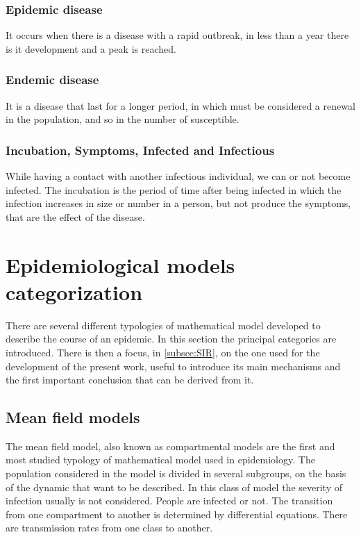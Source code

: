 \subsubsection{Epidemic disease} It occurs when there is a disease with a rapid outbreak, in less than a year there is it development and a peak is reached. 

\subsubsection{Endemic disease} It is a disease that last for a longer period, in which must be considered a renewal in the population, and so in the number of susceptible.

\subsubsection{Incubation, Symptoms, Infected and Infectious}   While having a contact with another infectious individual, we can or not become infected. The incubation is the period of time after being infected in which the infection increases in size or number in a person, but not produce the symptoms, that are the effect of the disease. 
\section{Epidemiological models categorization }
There are several different typologies of mathematical model developed to describe the course of an epidemic. In this section the principal categories are introduced. There is then a focus, in \ref{subsec:SIR}, on the one used for the development of the present work, useful to introduce its main mechanisms and the first important conclusion that can be derived from it. 


 
\subsection{Mean field models}

The mean field model, also known as compartmental models are the first and most studied typology of mathematical model used in epidemiology.  The population considered in the model is divided in several subgroups, on the basis of the dynamic that want to be described. In this class of model  the severity of infection usually is not considered. People are infected or not. The transition from one compartment to another is determined by differential equations. There are transmission rates from one class to another. 

